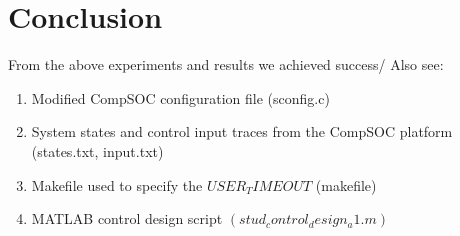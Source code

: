 \section{Conclusion}

From the above experiments and results we achieved success/ 
Also see:
\begin{enumerate}
	\item Modified CompSOC configuration file (sconfig.c)
	\item System states	and	control	input traces from the CompSOC platform (states.txt,	input.txt)
	\item Makefile used	to	specify	the	$USER_TIMEOUT$	(makefile)
	\item MATLAB	control	design	script	$(stud_control_design_a1.m)$
\end{enumerate}
